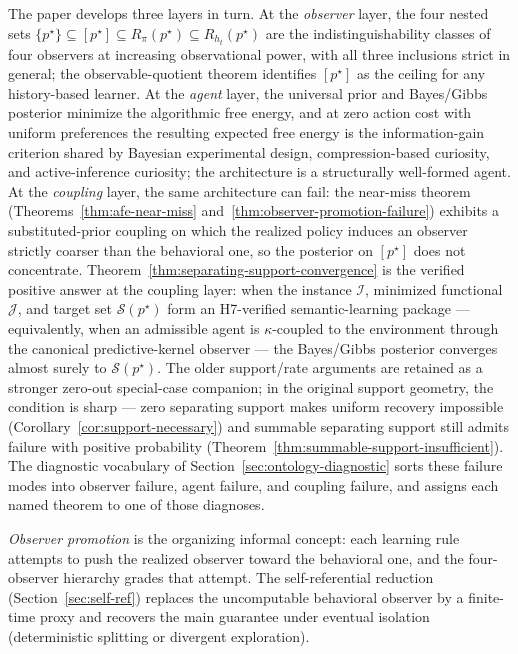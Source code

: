 \documentclass[11pt]{article}
\theoremstyle{definition}
\theoremstyle{remark}
\newcommand{\Scal}{\mathcal{S}}
\begin{document}
The paper develops three layers in turn. At the \emph{observer} layer, the four nested sets $\{p^\star\}\subseteq[p^\star]\subseteq R_\pi(p^\star)\subseteq R_{h_t}(p^\star)$ are the indistinguishability classes of four observers at increasing observational power, with all three inclusions strict in general; the observable-quotient theorem identifies $[p^\star]$ as the ceiling for any history-based learner. At the \emph{agent} layer, the universal prior and Bayes/Gibbs posterior minimize the algorithmic free energy, and at zero action cost with uniform preferences the resulting expected free energy is the information-gain criterion shared by Bayesian experimental design, compression-based curiosity, and active-inference curiosity; the architecture is a structurally well-formed agent. At the \emph{coupling} layer, the same architecture can fail: the near-miss theorem (Theorems~\ref{thm:afe-near-miss} and~\ref{thm:observer-promotion-failure}) exhibits a substituted-prior coupling on which the realized policy induces an observer strictly coarser than the behavioral one, so the posterior on $[p^\star]$ does not concentrate. Theorem~\ref{thm:separating-support-convergence} is the verified positive answer at the coupling layer: when the instance $\mathcal I$, minimized functional $\mathcal J$, and target set $\Scal(p^\star)$ form an H7-verified semantic-learning package --- equivalently, when an admissible agent is $\kappa$-coupled to the environment through the canonical predictive-kernel observer --- the Bayes/Gibbs posterior converges almost surely to $\Scal(p^\star)$. The older support/rate arguments are retained as a stronger zero-out special-case companion; in the original support geometry, the condition is sharp --- zero separating support makes uniform recovery impossible (Corollary~\ref{cor:support-necessary}) and summable separating support still admits failure with positive probability (Theorem~\ref{thm:summable-support-insufficient}). The diagnostic vocabulary of Section~\ref{sec:ontology-diagnostic} sorts these failure modes into observer failure, agent failure, and coupling failure, and assigns each named theorem to one of those diagnoses.

\emph{Observer promotion} is the organizing informal concept: each learning rule attempts to push the realized observer toward the behavioral one, and the four-observer hierarchy grades that attempt. The self-referential reduction (Section~\ref{sec:self-ref}) replaces the uncomputable behavioral observer by a finite-time proxy and recovers the main guarantee under eventual isolation (deterministic splitting or divergent exploration).
\end{document}
